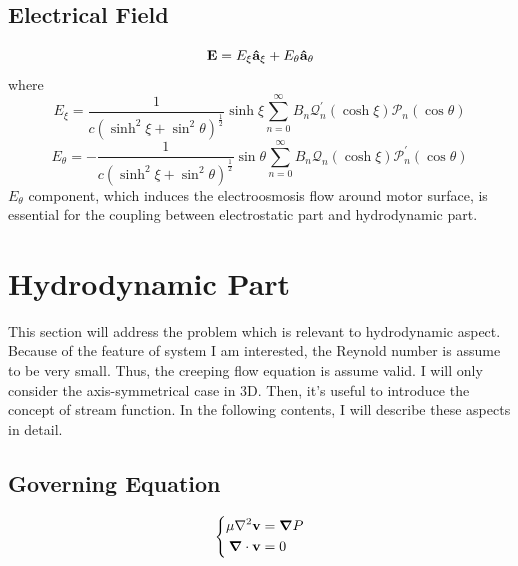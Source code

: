 \documentclass[fontsize=11pt, %
                             paper=a4, %
                             twoside, %
                             captions=tableheading,
                             index=totoc,
                             hyperref]{labbook}
\begin{document}
\subsection{Electrical Field}
\begin{equation}
\mathbf{E}=E_\xi \mathbf{\hat{a}}_\xi+E_\theta\mathbf{\hat{a}}_\theta
\end{equation}
where
\begin{equation}\label{Sln_E_xi}
E_\xi=\frac{1}{c(\sinh^2\xi+\sin^2\theta)^{\frac{1}{2}}}\sinh\xi\sum_{n=0}^\infty B_n \mathscr{Q}_n^\prime(\cosh\xi)\mathscr{P}_n(\cos\theta)
\end{equation}
\begin{equation}\label{Sln_E_theta}
E_\theta=-\frac{1}{c(\sinh^2\xi+\sin^2\theta)^{\frac{1}{2}}}\sin\theta\sum_{n=0}^\infty B_n\mathscr{Q}_n(\cosh\xi)\mathscr{P}_n^\prime(\cos\theta)
\end{equation}
$E_\theta$ component, which induces the electroosmosis flow around motor surface, is essential for the coupling between electrostatic part and hydrodynamic part.
\section{Hydrodynamic Part}
This section will address the problem which is relevant to hydrodynamic aspect. Because of the feature of system I am interested, the Reynold number is assume to be very small. Thus, the creeping flow equation is assume valid. I will only consider the axis-symmetrical case in 3D. Then, it's useful to introduce the concept of stream function.\cite{HappelBrenner1983} In the following contents, I will describe these aspects in detail.
\subsection{Governing Equation}
\begin{equation}
\left\{
\begin{aligned}
\mu\nabla^2\mathbf{v}&=\mbox{\boldmath$ \nabla $} P\\
\mbox{\boldmath$ \nabla $} \cdot \mathbf{v}&=0
\end{aligned}
\right.
\end{equation}
\end{document}
